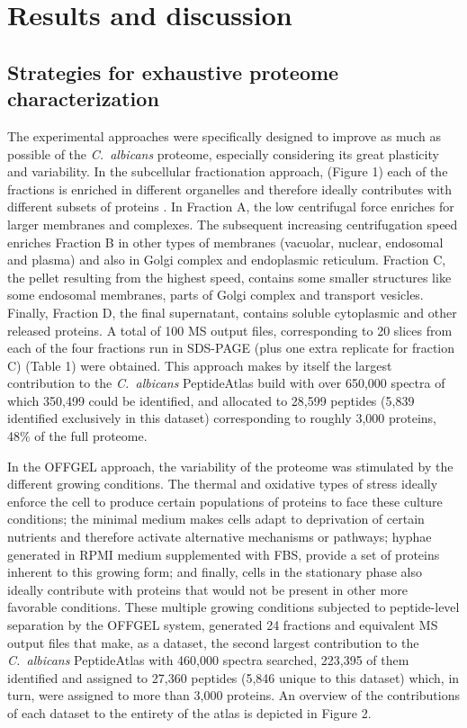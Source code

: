 \section*{Results and discussion}


\subsection*{Strategies for exhaustive proteome characterization}

The experimental approaches were specifically designed to improve as much as possible of
the \textit{\mbox{C. albicans}} proteome, especially considering its great plasticity and variability.
In the subcellular fractionation approach, (Figure 1) each of the fractions is enriched in
different organelles and therefore ideally contributes with different subsets of proteins \citep{Harford2001}.
In Fraction A, the low centrifugal force enriches for larger membranes and complexes. The
subsequent increasing centrifugation speed enriches Fraction B in other types of membranes
(vacuolar, nuclear, endosomal and plasma) and also in Golgi complex and endoplasmic
reticulum. Fraction C, the pellet resulting from the highest speed, contains some smaller
structures like some endosomal membranes, parts of Golgi complex and transport vesicles.
Finally, Fraction D, the final supernatant, contains soluble cytoplasmic and other released
proteins. A total of 100 MS output files, corresponding to 20 slices from each of the four
fractions run in SDS-PAGE (plus one extra replicate for fraction C) (Table 1) were obtained.
This approach makes by itself the largest contribution to the \textit{\mbox{C. albicans}} PeptideAtlas build
with over 650,000 spectra of which 350,499 could be identified, and allocated to 28,599
peptides (5,839 identified exclusively in this dataset) corresponding to roughly 3,000
proteins, 48\% of the full proteome.

In the OFFGEL approach, the variability of the proteome was stimulated by the different
growing conditions. The thermal and oxidative types of stress ideally enforce the cell to
produce certain populations of proteins to face these culture conditions; the minimal medium
makes cells adapt to deprivation of certain nutrients and therefore activate alternative
mechanisms or pathways; hyphae generated in RPMI medium supplemented with FBS,
provide a set of proteins inherent to this growing form; and finally, cells in the stationary
phase also ideally contribute with proteins that would not be present in other more favorable
conditions. These multiple growing conditions subjected to peptide-level separation by the
OFFGEL system, generated 24 fractions and equivalent MS output files that make, as a
dataset, the second largest contribution to the \textit{\mbox{C. albicans}} PeptideAtlas with 460,000 spectra
searched, 223,395 of them identified and assigned to 27,360 peptides (5,846 unique to this
dataset) which, in turn, were assigned to more than 3,000 proteins. An overview of the
contributions of each dataset to the entirety of the atlas is depicted in Figure 2.



